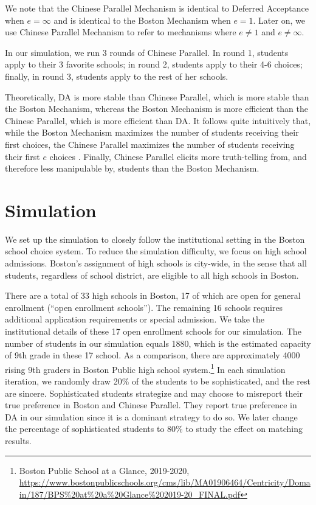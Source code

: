 \documentclass[10pt, reqno]{amsart}
\begin{document}
We note that the Chinese Parallel Mechanism is identical to Deferred Acceptance when $e = \infty$ and is identical to the Boston Mechanism when $e = 1$. Later on, we use Chinese Parallel Mechanism to refer to mechanisms where $e \not=1$ and $e\not = \infty.$

In our simulation, we run 3 rounds of Chinese Parallel. In round 1, students apply to their 3 favorite schools; in round 2, students apply to their 4-6 choices; finally, in round 3, students apply to the rest of her schools. 

Theoretically, DA is more stable than Chinese Parallel, which is more stable than the Boston Mechanism, whereas the Boston Mechanism is more efficient than the Chinese Parallel, which is more efficient than DA. It follows quite intuitively that, while the Boston Mechanism maximizes the number of students receiving their first choices, the Chinese Parallel maximizes the number of students receiving their first $e$ choices 
\citep{chen2013boston}. Finally, Chinese Parallel elicits more truth-telling from, and therefore less manipulable by, students than the Boston Mechanism.

\section{Simulation}
We set up the simulation to closely follow the institutional setting in the Boston school choice system. To reduce the simulation difficulty, we focus on high school admissions. Boston's assignment of high schools is city-wide, in the sense that all students, regardless of school district, are eligible to all high schools in Boston.

There are a total of 33 high schools in Boston, 17 of which are open for general enrollment (``open enrollment schools''). The remaining 16 schools requires additional application requirements or special admission. We take the institutional details of these 17 open enrollment schools for our simulation. The number of students in our simulation equals 1880, which is the estimated capacity of 9th grade in these 17 school. As a comparison, there are approximately 4000 rising 9th graders in Boston Public high school system.\footnote{Boston Public School at a Glance, 2019-2020, \url{https://www.bostonpublicschools.org/cms/lib/MA01906464/Centricity/Domain/187/BPS\%20at\%20a\%20Glance\%202019-20\_FINAL.pdf}} In each simulation iteration, we randomly draw 20\% of the students to be sophisticated, and the rest are sincere. Sophisticated students strategize and may choose to misreport their true preference in Boston and Chinese Parallel. They report true preference in DA in our simulation since it is a dominant strategy to do so. We later change the percentage of sophisticated students to 80\% to study the effect on matching results.
\end{document}
